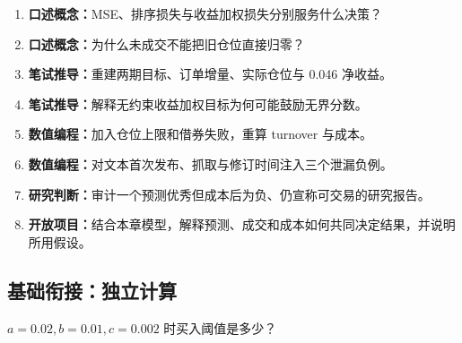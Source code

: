 \begin{enumerate}[leftmargin=*]
  \item \textbf{口述概念：}MSE、排序损失与收益加权损失分别服务什么决策？
  \item \textbf{口述概念：}为什么未成交不能把旧仓位直接归零？
  \item \textbf{笔试推导：}重建两期目标、订单增量、实际仓位与 0.046 净收益。
  \item \textbf{笔试推导：}解释无约束收益加权目标为何可能鼓励无界分数。
  \item \textbf{数值编程：}加入仓位上限和借券失败，重算 turnover 与成本。
  \item \textbf{数值编程：}对文本首次发布、抓取与修订时间注入三个泄漏负例。
  \item \textbf{研究判断：}审计一个预测优秀但成本后为负、仍宣称可交易的研究报告。
  \item \textbf{开放项目：}结合本章模型，解释预测、成交和成本如何共同决定结果，并说明所用假设。
\end{enumerate}

\subsection*{基础衔接：独立计算}
$a=0.02,b=0.01,c=0.002$ 时买入阈值是多少？
